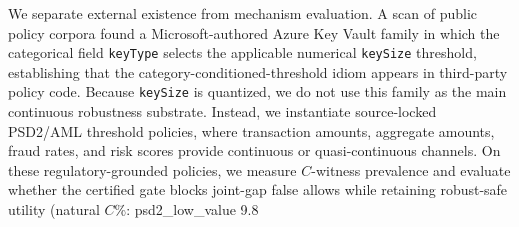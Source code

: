 We separate external existence from mechanism evaluation. A scan of public policy corpora found a Microsoft-authored Azure Key Vault family in which the categorical field \texttt{keyType} selects the applicable numerical \texttt{keySize} threshold, establishing that the category-conditioned-threshold idiom appears in third-party policy code. Because \texttt{keySize} is quantized, we do not use this family as the main continuous robustness substrate. Instead, we instantiate source-locked PSD2/AML threshold policies, where transaction amounts, aggregate amounts, fraud rates, and risk scores provide continuous or quasi-continuous channels. On these regulatory-grounded policies, we measure $C$-witness prevalence and evaluate whether the certified gate blocks joint-gap false allows while retaining robust-safe utility (natural $C\%$: psd2_low_value 9.8%
